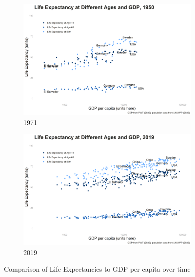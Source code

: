 \begin{figure}[H]
\centering
\begin{subfigure}[h]{0.5\textwidth}
  \centering
  \includegraphics[width=\textwidth]{figures/ECON-412/gdp_pc_le_1950.png}
  \caption{1971}
  \label{fig:sub1}
\end{subfigure}%
\begin{subfigure}[h]{0.5\textwidth}
  \centering
  \includegraphics[width=\textwidth]{figures/ECON-412/gdp_pc_le_2019.png}
  \caption{2019}
  \label{fig:sub2}
\end{subfigure}
\caption{Comparison of Life Expectancies to GDP per capita over time}
\label{fig:fig_01}
\end{figure}

